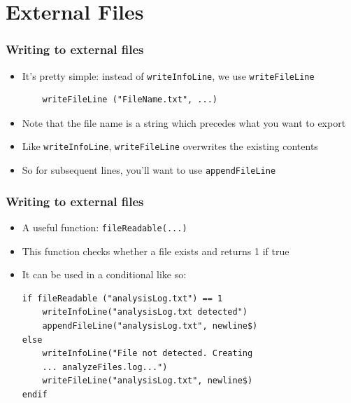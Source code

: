 \documentclass[handout]{beamer}
\begin{document}
\section{External Files}

\begin{frame}[fragile]
\frametitle{Writing to external files}

\begin{itemize}
    \item <1-> It's pretty simple: instead of \texttt{writeInfoLine}, we use \texttt{writeFileLine}

    \begin{verbatim}
    writeFileLine ("FileName.txt", ...)
    \end{verbatim}

    \item <1-> Note that the file name is a string which precedes what you want to export

    \item <2-> Like \texttt{writeInfoLine}, \texttt{writeFileLine} overwrites the existing contents

    \item <2-> So for subsequent lines, you'll want to use \texttt{appendFileLine}
\end{itemize}
\end{frame}

\begin{frame}[fragile]
\frametitle{Writing to external files}

\begin{itemize}
    \item <1-> A useful function: \texttt{fileReadable(...)}

    \item <1-> This function checks whether a file exists and returns 1 if true

    \item <2-> It can be used in a conditional like so:

    \begin{verbatim}
if fileReadable ("analysisLog.txt") == 1
    writeInfoLine("analysisLog.txt detected")
    appendFileLine("analysisLog.txt", newline$)    
else
    writeInfoLine("File not detected. Creating
    ... analyzeFiles.log...")
    writeFileLine("analysisLog.txt", newline$) 
endif
    \end{verbatim}
\end{itemize}
\end{frame}
\end{document}
